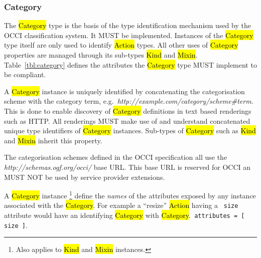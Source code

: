 \documentclass[10pt,a4paper]{article}
\begin{document}
\subsubsection{Category}
\label{sec:category}
The \hl{Category} type is the basis of the type
identification mechanism used by the
OCCI classification system. It MUST be implemented. Instances of the
\hl{Category} type itself are only used to identify \hl{Action} types. All
other uses of \hl{Category} properties are managed through its sub-types
\hl{Kind} and \hl{Mixin}.
%
Table~\ref{tbl:category} defines the attributes the \hl{Category} type MUST
implement to be compliant.


A \hl{Category} instance is uniquely identified by concatenating the
categorisation scheme with the category term,
e.g.~\textit{http://example.com/category/scheme\#term}.
This is done to enable discovery of \hl{Category} definitions in text based
renderings such as HTTP. All renderings MUST make use of and understand
concatenated unique type identifiers of \hl{Category} instances.
%
Sub-types of \hl{Category} such as \hl{Kind} and \hl{Mixin} inherit this property.

The categorisation schemes defined in the OCCI specification all use the
\textit{http://schemas.ogf.org/occi/} base URL. This base URL is reserved for
OCCI an MUST NOT be used by service provider extensions.

A \hl{Category} instance%
\footnote{Also applies to \hl{Kind} and \hl{Mixin} instances.}
define the {\em names} of the attributes exposed by any instance associated
with the \hl{Category}.  For example a ``resize'' \hl{Action} having a {\tt
size} attribute would have an identifying \hl{Category} with \hl{Category}.{\tt
attributes = [ size ]}.
\end{document}

